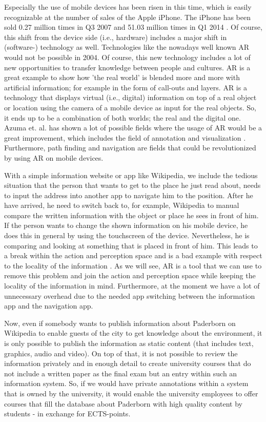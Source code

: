 \documentclass[a4page]{article}
\begin{document}
Especially the use of mobile devices has been risen in this time, which is easily recognizable at the number of sales of the Apple iPhone. The iPhone has been sold 0.27 million times in Q3 2007 and 51.03 million times in Q1 2014 \cite{statIPhone}. Of course, this shift from the device side (i.e., hardware) includes a major shift in (software-) technology as well. Technologies like the nowadays well known \ac{AR} would not be possible in 2004. Of course, this new technology includes a lot of new opportunities to transfer knowledge between people and cultures. \ac{AR} is a great example to show how 'the real world' is blended more and more with artificial information; for example in the form of call-outs and layers. \ac{AR} is a technology that displays virtual (i.e., digital) information on top of a real object or location using the camera of a mobile device as input for the real objects. So, it ends up to be a combination of both worlds; the real and the digital one. Azuma et. al. has shown a lot of possible fields where the usage of \ac{AR} would be a great improvement, which includes the field of annotation and visualization \cite{Azu97}. Furthermore, path finding and navigation are fields that could be revolutionized by using \ac{AR} on mobile devices.

With a simple information website or app like Wikipedia, we include the tedious situation that the person that wants to get to the place he just read about, needs to input the address into another app to navigate him to the position. After he have arrived, he need to switch back to, for example, Wikipedia to manual compare the written information with the object or place he sees in front of him. If the person wants to change the shown information on his mobile device, he does this in general by using the touchscreen of the device. Nevertheless, he is comparing and looking at something that is placed in front of him. This leads to a break within the action and perception space \cite{ham01} and is a bad example with respect to the locality of the information \cite{Bon10}. As we will see, \ac{AR} is a tool that we can use to remove this problem and join the action and perception space while keeping the locality of the information in mind.  Furthermore, at the moment we have a lot of unnecessary overhead due to the needed app switching between the information app and the navigation app.   

Now, even if somebody wants to publish information about Paderborn on Wikipedia to enable guests of the city to get knowledge about the environment, it is only possible to publish the information as static content (that includes text, graphics, audio and video). On top of that, it is not possible to review the information privately and in enough detail to create university courses that do not include a written paper as the final exam but an entry within such an information system.  So, if we would have private annotations within a system that is owned by the university, it would enable the university employees to offer courses that fill the database about Paderborn with high quality content by students - in exchange for \ac{ECTS}-points.
\end{document}
